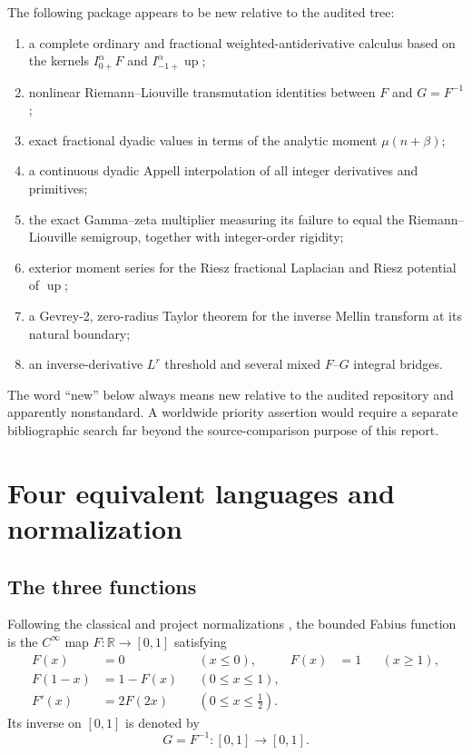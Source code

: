 \documentclass[11pt,oneside]{article}
\theoremstyle{definition}
\theoremstyle{remark}
\newcommand{\Up}{\operatorname{up}}
\newcommand{\R}{\mathbb R}
\newcommand{\1}{\mathbf 1}
\begin{document}
The following package appears to be new relative to the audited tree:
\begin{enumerate}
\item a complete ordinary and fractional weighted-antiderivative calculus based on the kernels
      $I_{0+}^{\alpha}F$ and $I_{-1+}^{\alpha}\Up$;
\item nonlinear Riemann--Liouville transmutation identities between $F$ and $G=F^{-1}$;
\item exact fractional dyadic values in terms of the analytic moment $\mu(n+\beta)$;
\item a continuous dyadic Appell interpolation of all integer derivatives and primitives;
\item the exact Gamma--zeta multiplier measuring its failure to equal the
      Riemann--Liouville semigroup, together with integer-order rigidity;
\item exterior moment series for the Riesz fractional Laplacian and Riesz potential of $\Up$;
\item a Gevrey-2, zero-radius Taylor theorem for the inverse Mellin transform at its natural
      boundary;
\item an inverse-derivative $L^r$ threshold and several mixed $F$--$G$ integral bridges.
\end{enumerate}

The word ``new'' below always means new relative to the audited repository and apparently
nonstandard.  A worldwide priority assertion would require a separate bibliographic search
far beyond the source-comparison purpose of this report.

\section{Four equivalent languages and normalization}
\label{p7:sec:notation}

\subsection{The three functions}

\begin{definition}
Following the classical and project normalizations \cite{p7:fabius1966,p7:rvachev1990,p7:project-primary},
the bounded Fabius function is the $C^\infty$ map $F:\R\to[0,1]$ satisfying
\begin{align}
 F(x)&=0 &&(x\le0),& F(x)&=1 &&(x\ge1),\label{p7:eq:F-total}\\
 F(1-x)&=1-F(x) &&(0\le x\le1),\label{p7:eq:F-sym}\\
 F'(x)&=2F(2x) &&(0\le x\le\tfrac12).\label{p7:eq:F-dilation}
\end{align}
Its inverse on $[0,1]$ is denoted by
\[
 G=F^{-1}:[0,1]\longrightarrow[0,1].
\]
\end{definition}
\end{document}
